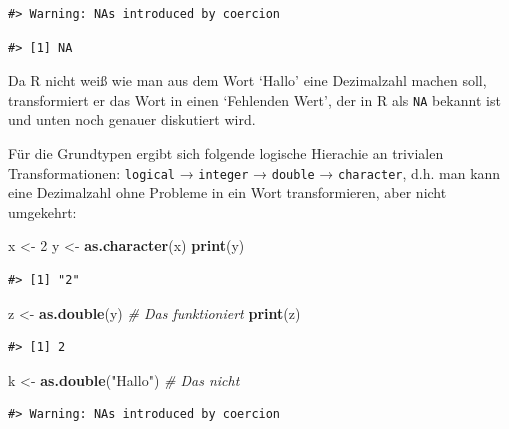 \documentclass[]{book}
\newenvironment{Shaded}{\begin{snugshade}}{\end{snugshade}}
\newcommand{\KeywordTok}[1]{\textcolor[rgb]{0.13,0.29,0.53}{\textbf{#1}}}
\newcommand{\DecValTok}[1]{\textcolor[rgb]{0.00,0.00,0.81}{#1}}
\newcommand{\StringTok}[1]{\textcolor[rgb]{0.31,0.60,0.02}{#1}}
\newcommand{\CommentTok}[1]{\textcolor[rgb]{0.56,0.35,0.01}{\textit{#1}}}
\newcommand{\NormalTok}[1]{#1}
\begin{document}
\begin{verbatim}
#> Warning: NAs introduced by coercion
\end{verbatim}

\begin{verbatim}
#> [1] NA
\end{verbatim}

Da R nicht weiß wie man aus dem Wort `Hallo' eine Dezimalzahl machen
soll, transformiert er das Wort in einen `Fehlenden Wert', der in R als
\texttt{NA} bekannt ist und unten noch genauer diskutiert wird.

Für die Grundtypen ergibt sich folgende logische Hierachie an trivialen
Transformationen: \texttt{logical} → \texttt{integer} → \texttt{double}
→ \texttt{character}, d.h. man kann eine Dezimalzahl ohne Probleme in
ein Wort transformieren, aber nicht umgekehrt:

\begin{Shaded}
\begin{Highlighting}[]
\NormalTok{x <-}\StringTok{ }\DecValTok{2}
\NormalTok{y <-}\StringTok{ }\KeywordTok{as.character}\NormalTok{(x)}
\KeywordTok{print}\NormalTok{(y)}
\end{Highlighting}
\end{Shaded}

\begin{verbatim}
#> [1] "2"
\end{verbatim}

\begin{Shaded}
\begin{Highlighting}[]
\NormalTok{z <-}\StringTok{ }\KeywordTok{as.double}\NormalTok{(y) }\CommentTok{# Das funktioniert}
\KeywordTok{print}\NormalTok{(z)}
\end{Highlighting}
\end{Shaded}

\begin{verbatim}
#> [1] 2
\end{verbatim}

\begin{Shaded}
\begin{Highlighting}[]
\NormalTok{k <-}\StringTok{ }\KeywordTok{as.double}\NormalTok{(}\StringTok{"Hallo"}\NormalTok{) }\CommentTok{# Das nicht}
\end{Highlighting}
\end{Shaded}

\begin{verbatim}
#> Warning: NAs introduced by coercion
\end{verbatim}
\end{document}
